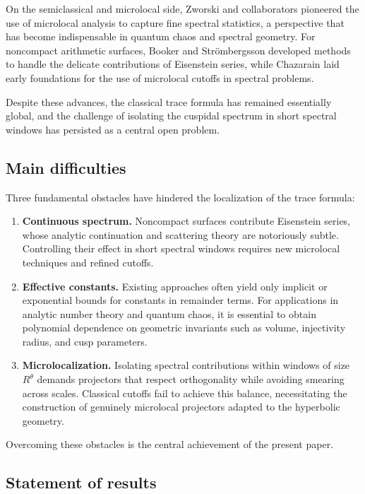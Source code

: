 On the semiclassical and microlocal side, Zworski and collaborators \cite{zworski2012,dyatlovzworski2019} pioneered the use of microlocal analysis to capture fine spectral statistics, a perspective that has become indispensable in quantum chaos and spectral geometry. For noncompact arithmetic surfaces, Booker and Strömbergsson \cite{booker2006} developed methods to handle the delicate contributions of Eisenstein series, while Chazarain \cite{chazarain1974} laid early foundations for the use of microlocal cutoffs in spectral problems.

Despite these advances, the classical trace formula has remained essentially global, and the challenge of isolating the cuspidal spectrum in short spectral windows has persisted as a central open problem.

\subsection{Main difficulties}\label{subsec:difficulties}

Three fundamental obstacles have hindered the localization of the trace formula:

\begin{enumerate}
  \item \textbf{Continuous spectrum.} Noncompact surfaces contribute Eisenstein series, whose analytic continuation and scattering theory are notoriously subtle. Controlling their effect in short spectral windows requires new microlocal techniques and refined cutoffs.
  \item \textbf{Effective constants.} Existing approaches often yield only implicit or exponential bounds for constants in remainder terms. For applications in analytic number theory and quantum chaos, it is essential to obtain polynomial dependence on geometric invariants such as volume, injectivity radius, and cusp parameters.
  \item \textbf{Microlocalization.} Isolating spectral contributions within windows of size $R^\theta$ demands projectors that respect orthogonality while avoiding smearing across scales. Classical cutoffs fail to achieve this balance, necessitating the construction of genuinely microlocal projectors adapted to the hyperbolic geometry.
\end{enumerate}

Overcoming these obstacles is the central achievement of the present paper.

\subsection{Statement of results}\label{subsec:results}

